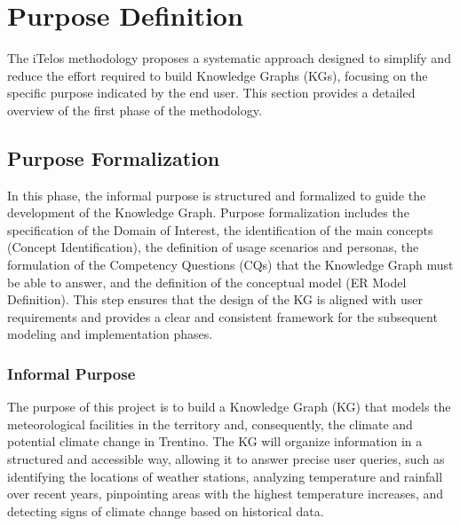 \section{Purpose Definition}
The iTelos methodology proposes a systematic approach designed to simplify and reduce the effort required to build Knowledge Graphs (KGs), focusing on the specific purpose indicated by the end user. This section provides a detailed overview of the first phase of the methodology.

\subsection{Purpose Formalization}
In this phase, the informal purpose is structured and formalized to guide the development of the Knowledge Graph. Purpose formalization includes the specification of the Domain of Interest, the identification of the main concepts (Concept Identification), the definition of usage scenarios and personas, the formulation of the Competency Questions (CQs) that the Knowledge Graph must be able to answer, and the definition of the conceptual model (ER Model Definition). This step ensures that the design of the KG is aligned with user requirements and provides a clear and consistent framework for the subsequent modeling and implementation phases.
\subsubsection{Informal Purpose}
The purpose of this project is to build a Knowledge Graph (KG) that models the meteorological facilities in the territory and, consequently, the climate and potential climate change in Trentino. The KG will organize information in a structured and accessible way, allowing it to answer precise user queries, such as identifying the locations of weather stations, analyzing temperature and rainfall over recent years, pinpointing areas with the highest temperature increases, and detecting signs of climate change based on historical data.


